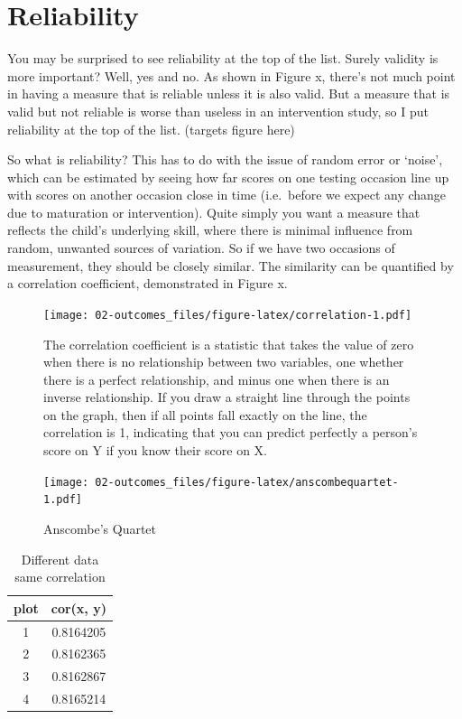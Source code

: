 \documentclass[]{book}
\begin{document}
\hypertarget{reliability}{%
\section{Reliability}\label{reliability}}

You may be surprised to see reliability at the top of the list. Surely validity is more important? Well, yes and no. As shown in Figure x, there's not much point in having a measure that is reliable unless it is also valid. But a measure that is valid but not reliable is worse than useless in an intervention study, so I put reliability at the top of the list.
(targets figure here)

So what is reliability? This has to do with the issue of random error or `noise', which can be estimated by seeing how far scores on one testing occasion line up with scores on another occasion close in time (i.e.~before we expect any change due to maturation or intervention). Quite simply you want a measure that reflects the child's underlying skill, where there is minimal influence from random, unwanted sources of variation. So if we have two occasions of measurement, they should be closely similar. The similarity can be quantified by a correlation coefficient, demonstrated in Figure x.

\begin{figure}
\centering
\texttt{[image: 02-outcomes\_files/figure-latex/correlation-1.pdf]}
\caption{\label{fig:correlation}The correlation coefficient is a statistic that takes the value of zero when there is no relationship between two variables, one whether there is a perfect relationship, and minus one when there is an inverse relationship. If you draw a straight line through the points on the graph, then if all points fall exactly on the line, the correlation is 1, indicating that you can predict perfectly a person's score on Y if you know their score on X.}
\end{figure}

\begin{figure}
\centering
\texttt{[image: 02-outcomes\_files/figure-latex/anscombequartet-1.pdf]}
\caption{\label{fig:anscombequartet}Anscombe's Quartet}
\end{figure}

\begin{table}[t]

\caption{\label{tab:AQTable}Different data same correlation}
\centering
\begin{tabular}{cc}
\toprule
plot & cor(x, y)\\
\midrule
\rowcolor{gray!6}  1 & 0.8164205\\
2 & 0.8162365\\
\rowcolor{gray!6}  3 & 0.8162867\\
4 & 0.8165214\\
\bottomrule
\end{tabular}
\end{table}
\end{document}
